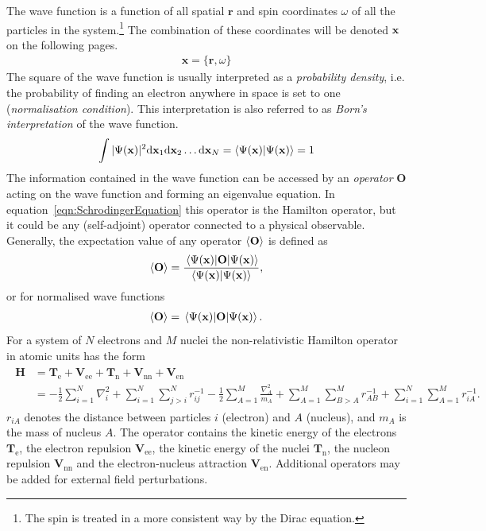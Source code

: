 The wave function is a function of all spatial $\mathbf{r}$ and spin
coordinates $\omega$ of all the particles in the system.\footnote{The spin
is treated in a more consistent way by the Dirac equation.} The combination of
these coordinates will be denoted $\mathbf{x}$ on the following pages.  
%
\begin{align}
	\mathbf{x}=\{\mathbf{r},\omega\}
\end{align}
%
The square of the wave function is usually interpreted as a \textit{probability
density}, i.e. the probability of finding an
electron anywhere in space is set to one (\textit{normalisation condition}). This interpretation is also referred to as
\textit{Born's interpretation} of the wave
function.\autocite{Born_ZurQuantenmechanikStossvorgaenge_1926,Born_AdiabatenprinzipQuantenmechanik_1927}
%
\begin{align}
	\int |\Psi(\mathbf{x})|^2\dd \mathbf{x}_1\dd \mathbf{x}_2\ldots\dd \mathbf{x}_N=\braket{\Psi(\mathbf{x})}=1
\end{align}
%
The information contained in the wave function can be accessed by an \textit{operator}
$\mathbf{O}$ acting on the wave function and forming an eigenvalue equation. In
equation~\eqref{eqn:SchrodingerEquation} this operator is the Hamilton
operator, but it could be any (self-adjoint) operator connected to a physical observable.
Generally, the expectation value of any operator $\expval{\mathbf{O}}$ is
defined as
%
\begin{equation}
    \expval{\mathbf{O}}=\frac{\expval{\mathbf{O}}{\Psi(\mathbf{x})}}{\braket{\Psi(\mathbf{x})}},
\end{equation}
%
or for normalised wave functions
%
\begin{align}
    \expval{\mathbf{O}}=\expval{\mathbf{O}}{\Psi(\mathbf{x})}.
\end{align}
%
For a system of $N$ electrons and $M$ nuclei the non-relativistic Hamilton
operator in atomic units has the form
%
\begin{align}
\begin{aligned}
    \mathbf{H}&=\mathbf{T}_\text{e} + \mathbf{V}_\text{ee} + \mathbf{T}_\text{n} + \mathbf{V}_\text{nn} + \mathbf{V}_\text{en} \\
    &=-\frac{1}{2}\sum_{i=1}^N\nabla_i^2
    + \sum_{i=1}^N\sum_{j>i}^Nr_{ij}^{-1}
    -\frac{1}{2} \sum_{A=1}^M\frac{\nabla_A^2}{m_A}
    + \sum_{A=1}^M\sum_{B>A}^Mr_{AB}^{-1}
    + \sum_{i=1}^N\sum_{A=1}^Mr_{iA}^{-1}.\label{eqn:hamiltonoperator}
\end{aligned}
\end{align}
%
$r_{iA}$ denotes the distance between particles $i$ (electron) and $A$ (nucleus), and $m_A$ is the mass of nucleus $A$. 
The operator contains the kinetic energy of the electrons
$\mathbf{T}_\text{e}$, the electron repulsion $\mathbf{V}_\text{ee}$, the
kinetic energy of the nuclei $\mathbf{T}_\text{n}$, the nucleon repulsion
$\mathbf{V}_\text{nn}$ and the electron-nucleus attraction
$\mathbf{V}_\text{en}$. Additional operators may be added for external field perturbations.

